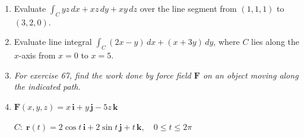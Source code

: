\documentclass[12pt, twoside]{article}
\begin{document}
\begin{enumerate}[leftmargin=*, itemsep=1.5em]
\item[\textbf{57.}]
Evaluate $\displaystyle\int_C yz\,dx + xz\,dy + xy\,dz$ over the line segment from
$(1,1,1)$ to $(3,2,0)$.

\item[\textbf{62.}]
Evaluate line integral $\displaystyle\int_C (2x-y)\,dx + (x+3y)\,dy$, where $C$ lies
along the $x$-axis from $x=0$ to $x=5$.

\item[]\textit{For exercise 67, find the work done by force field $\mathbf{F}$ on an object
moving along the indicated path.}

\item[\textbf{67.}]
$\mathbf{F}(x,y,z) = x\,\mathbf{i} + y\,\mathbf{j} - 5z\,\mathbf{k}$

\smallskip
$C\colon\;\mathbf{r}(t) = 2\cos t\,\mathbf{i} + 2\sin t\,\mathbf{j} + t\,\mathbf{k},
\quad 0\le t\le 2\pi$

\end{enumerate}
\end{document}
